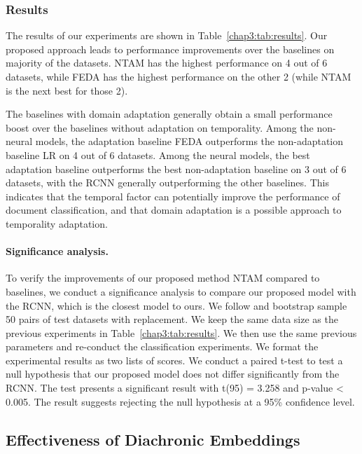 \subsubsection{Results}
\label{chap3:sec:results}


The results of our experiments are shown in Table~\ref{chap3:tab:results}. 
Our proposed approach leads to performance improvements over the baselines on majority of the datasets.
NTAM has the highest performance on 4 out of 6 datasets, while FEDA has the highest performance on the other 2 (while NTAM is the next best for those 2).


The baselines with domain adaptation generally obtain a small performance boost over the baselines without adaptation on temporality. 
Among the non-neural models, the adaptation baseline FEDA outperforms the non-adaptation baseline LR on 4 out of 6 datasets. 
Among the neural models, the best adaptation baseline outperforms the best non-adaptation baseline on 3 out of 6 datasets,
with the RCNN generally outperforming the other baselines.
This indicates that the temporal factor can potentially improve the performance of document classification, and that domain adaptation is a possible approach to temporality adaptation. 

\paragraph{Significance analysis.} 
To verify the improvements of our proposed method NTAM compared to baselines, we conduct a significance analysis to compare our proposed model with the RCNN, which is the closest model to ours. We follow \cite{berg2012empirical} and bootstrap sample 50 pairs of test datasets with replacement. We keep the same data size as the previous experiments in Table~\ref{chap3:tab:results}. We then use the same previous parameters and re-conduct the classification experiments. We format the experimental results as two lists of scores. We conduct a paired t-test to test a null hypothesis that our proposed model does not differ significantly from the RCNN. The test presents a significant result with t(95) = 3.258 and p-value < 0.005. The result suggests rejecting the null hypothesis at a 95\% confidence level.


\subsection{Effectiveness of Diachronic Embeddings}

